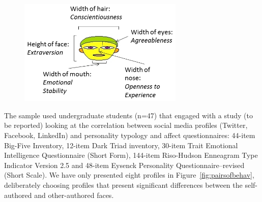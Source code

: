 \documentclass{llncs}
\begin{document}


\begin{figure}[!ht]
\centering
  \includegraphics[width=0.7\textwidth]{images/MeanChernoffFace.jpg}
  \label{fig:chernoff}
\end{figure}

The sample used undergraduate students (n=47) that engaged with a
study (to be reported) looking at the correlation between social media
profiles (Twitter, Facebook, LinkedIn) and personality typology and
affect questionnaires: 44-item Big-Five Inventory, 12-item Dark Triad
inventory, 30-item Trait Emotional Intelligence Questionnaire (Short
Form), 144-item Riso-Hudson Enneagram Type Indicator Version 2.5 and
48-item Eysenck Personality Questionnaire--revised (Short Scale). We
have only presented eight profiles in Figure~\ref{fig:pairsofbehav},
deliberately choosing profiles that present significant differences
between the self-authored and other-authored faces.
\end{document}
